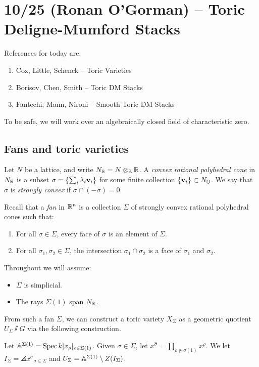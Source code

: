 \documentclass{amsart}
\begin{document}
\section{10/25 (Ronan O'Gorman) -- Toric Deligne-Mumford Stacks}

References for today are:
\begin{enumerate}
	\item Cox, Little, Schenck -- Toric Varieties
	\item Borisov, Chen, Smith -- Toric DM Stacks
	\item Fantechi, Mann, Nironi -- Smooth Toric DM Stacks
\end{enumerate}

To be safe, we will work over an algebraically closed field of characteristic zero.

\subsection{Fans and toric varieties}

Let $N$ be a lattice, and write $N_\RR = N \otimes_\ZZ \RR$.
A \emph{convex rational polyhedral cone} in $N_\RR$ is a subset $\sigma = \{ \sum_i \lambda_i \vbf_i \}$ for some finite collection $\{ \vbf_i \} \subset N_\QQ$.
We say that $\sigma$ is \emph{strongly convex} if $\sigma \cap (-\sigma) = 0$.

Recall that a \emph{fan} in $\RR^n$ is a collection $\Sigma$ of strongly convex rational polyhedral cones such that:
\begin{enumerate}
	\item For all $\sigma \in \Sigma$, every face of $\sigma$ is an element of $\Sigma$.
	\item For all $\sigma_1, \sigma_2 \in \Sigma$, the intersection $\sigma_1 \cap \sigma_2$ is a face of $\sigma_1$ and $\sigma_2$.
\end{enumerate}

Throughout we will assume:
\begin{itemize}
	\item $\Sigma$ is simplicial.
	\item The rays $\Sigma(1)$ span $N_\RR$.
\end{itemize}
From such a fan $\Sigma$, we can construct a toric variety $X_\Sigma$ as a geometric quotient $U_\Sigma \sslash G$ via the following construction.

Let $\AA^{\Sigma(1)} = \Spec k[x_\rho]_{\rho \in \Sigma(1)}$.
Given $\sigma \in \Sigma$, let $x^{\hat{\sigma}} = \prod_{\rho \not\in \sigma(1)} x^\rho$.
We let $I_\Sigma = \angles{x^{\hat{\sigma}}}_{\sigma \in \Sigma}$ and $U_\Sigma = \AA^{\Sigma(1)} \setminus Z(I_\Sigma)$.
\end{document}
